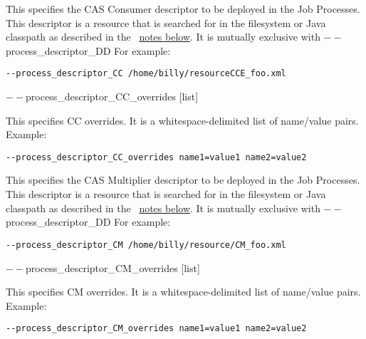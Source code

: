\begin{description}
           \item[$--$process\_descriptor\_CC {[descriptor]}  ]

             This specifies the CAS Consumer descriptor to be deployed in the Job Processes. This 
             descriptor is a resource that is searched for in the filesystem or Java classpath as described 
             in the ~\hyperref[par:cli.submit.notes]{notes below}.
             It is mutually exclusive with $--$process\_descriptor\_DD For example: 
             \begin{verbatim}
--process_descriptor_CC /home/billy/resourceCCE_foo.xml 
             \end{verbatim}

           \begin{sloppypar}             
           \item[$--$process\_descriptor\_CC\_overrides {[list]}  ]

             This specifies CC overrides. It is a whitespace-delimited list of name/value pairs. Example: 
             \begin{verbatim}
--process_descriptor_CC_overrides name1=value1 name2=value2 
             \end{verbatim}
           \end{sloppypar}             
           
           \item[$--$process\_descriptor\_CM {[descriptor]} ]

             This specifies the CAS Multiplier descriptor to be deployed in the Job Processes. This 
             descriptor is a resource that is searched for in the filesystem or Java classpath as described 
             in the ~\hyperref[par:cli.submit.notes]{notes below}.
             It is mutually exclusive with $--$process\_descriptor\_DD For example: 
             \begin{verbatim}             
--process_descriptor_CM /home/billy/resource/CM_foo.xml 
             \end{verbatim}

           \begin{sloppypar}             
           \item[$--$process\_descriptor\_CM\_overrides {[list]}  ]

             This specifies CM overrides. It is a whitespace-delimited list of name/value pairs. Example: 
\begin{verbatim}
--process_descriptor_CM_overrides name1=value1 name2=value2 
\end{verbatim}
           \end{sloppypar}
           

\end{description}
